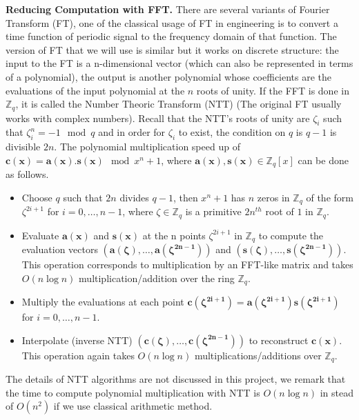 \begin{description}
\begin{description}
            \textbf{Reducing Computation with FFT.} There are several variants
            of Fourier Transform (FT), one of the classical usage of FT in
            engineering is to convert a time function of periodic signal to the
            frequency domain of that function. The version of FT
            that we will use is similar but it works on discrete structure: the
            input to the FT is a n-dimensional vector (which can also be
            represented in terms
            of a polynomial), the output is another polynomial whose coefficients
            are the evaluations of the input polynomial at the $n$ roots of unity.
            If the FFT is done in $\mathbb{Z}_q$, it is called the Number
            Theoric Transform (NTT) (The original FT usually works with complex
            numbers). Recall that the NTT's roots of unity are $\zeta_i$ such that
            $\zeta_i^n = -1\mod q$ and in order for $\zeta_i$ to exist,
            the condition on $q$ is $q -1$ is divisible $2n$.
            The polynomial multiplication speed up of $\mathbf{c(x) = a(x).s(x)} \mod x^n
            +1$, where $\mathbf{a(x),s(x)} \in \mathbb{Z}_q[x]$ can be done as
            follows.
            \begin{itemize}
                \item Choose $q$ such that $2n$ divides $q-1$, then $x^n + 1$
                    has $n$ zeros in $\mathbb{Z}_q$ of the form $\zeta^{2i + 1}$
                    for $i = 0,\dots,n-1$, where $\zeta \in \mathbb{Z}_q$ is a
                    primitive $2n^{th}$ root of $1$ in $\mathbb{Z}_q$.
                \item Evaluate $\mathbf{a(x)}$ and $\mathbf{s(x)}$ at the n
                    points $\zeta^{2i + 1}$ in $\mathbb{Z}_q$ to compute the
                    evaluation vectors
                    $\mathbf{(a(\zeta),\dots,a(\zeta^{2n-1}))}$ and
                    $\mathbf{(s(\zeta), \dots, s(\zeta^{2n - 1}))}$. This
                    operation corresponds to multiplication by an FFT-like
                    matrix and takes $O(n \log n)$ multiplication/addition over
                    the ring $\mathbb{Z}_q$.
                \item Multiply the evaluations at each point
                    $\mathbf{c(\zeta^{2i + 1}) =
                    a(\zeta^{2i+1})s(\zeta^{2i+1})}$ for $i = 0,\dots,n-1$.
                \item Interpolate (inverse NTT) $\mathbf{(c(\zeta), \dots,
                    c(\zeta^{2n-1}))}$ to reconstruct $\mathbf{c(x)}$. This
                    operation again takes $O(n\log n)$ multiplications/additions
                    over $\mathbb{Z}_q$.
            \end{itemize}
            The details of NTT
            algorithms are not discussed in this project, we remark that the
            time to compute polynomial multiplication with NTT is $O(n \log n)$
            in stead of $O(n^2)$ if we use classical arithmetic method.


\end{description}
\end{description}
